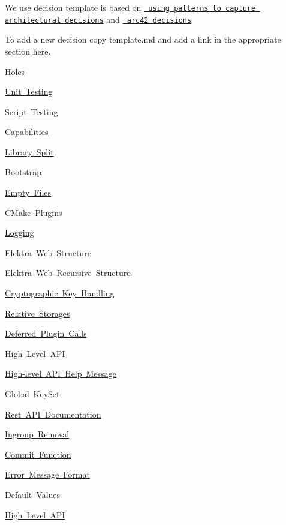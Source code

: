 We use decision template is based on \href{http://www.cs.rug.nl/~paris/papers/IEEESW07.pdf}{\texttt{ \textquotesingle{}\textquotesingle{}using patterns to capture architectural decisions\textquotesingle{}\textquotesingle{}}} and \href{http://docs.arc42.org/section-9/}{\texttt{ arc42 decisions}}

To add a new decision copy {\ttfamily template.\+md} and add a link in the appropriate section here.


\begin{DoxyItemize}
\item \mbox{\hyperlink{doc_decisions_holes_md}{Holes}}
\item \mbox{\hyperlink{doc_decisions_unit_testing_md}{Unit Testing}}
\item \mbox{\hyperlink{doc_decisions_script_testing_md}{Script Testing}}
\item \mbox{\hyperlink{doc_decisions_capabilities_md}{Capabilities}}
\item \mbox{\hyperlink{doc_decisions_library_split_md}{Library Split}}
\item \mbox{\hyperlink{doc_decisions_bootstrap_md}{Bootstrap}}
\item \mbox{\hyperlink{doc_decisions_empty_files_md}{Empty Files}}
\item \mbox{\hyperlink{doc_decisions_cmake_plugins_md}{C\+Make Plugins}}
\item \mbox{\hyperlink{doc_decisions_logging_md}{Logging}}
\item \mbox{\hyperlink{doc_decisions_elektra_web_md}{Elektra Web Structure}}
\item \mbox{\hyperlink{doc_decisions_elektra_web_recursive_md}{Elektra Web Recursive Structure}}
\item \mbox{\hyperlink{doc_decisions_cryptograhic_key_handling_md}{Cryptographic Key Handling}}
\item \mbox{\hyperlink{doc_decisions_relative_md}{Relative Storages}}
\item \mbox{\hyperlink{doc_decisions_deferred_plugin_calls_md}{Deferred Plugin Calls}}
\item \mbox{\hyperlink{doc_decisions_high_level_api_md}{High Level A\+PI}}
\item \mbox{\hyperlink{doc_decisions_highlevel_help_message_md}{High-\/level A\+PI Help Message}}
\item \mbox{\hyperlink{doc_decisions_global_keyset_md}{Global Key\+Set}}
\item \mbox{\hyperlink{doc_decisions_rest_api_documentation_md}{Rest A\+PI Documentation}}
\item \mbox{\hyperlink{doc_decisions_ingroup_removal_md}{Ingroup Removal}}
\item \mbox{\hyperlink{doc_decisions_commit_function_md}{Commit Function}}
\item \mbox{\hyperlink{doc_decisions_error_message_format_md}{Error Message Format}}
\item \mbox{\hyperlink{doc_decisions_default_values_md}{Default Values}}
\item \mbox{\hyperlink{doc_decisions_high_level_api_md}{High Level A\+PI}}
\end{DoxyItemize}


